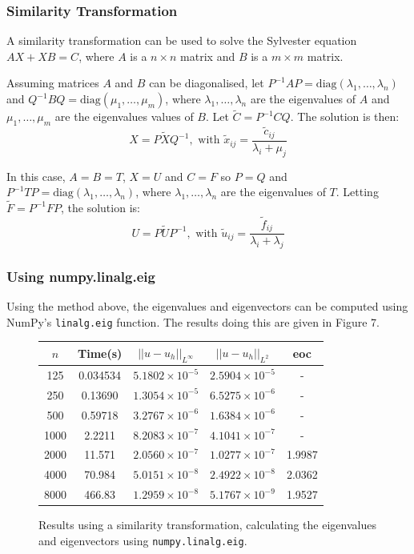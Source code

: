 \documentclass{article}
\numberwithin{equation}{section}
\begin{document}
\subsubsection{Similarity Transformation}
A similarity transformation \cite{Simoncini} can be used to solve the Sylvester equation $AX + XB = C$, where $A$ is a $n \times n$ matrix and $B$ is a $m \times m$ matrix. 

Assuming matrices $A$ and $B$ can be diagonalised, let $P^{-1}AP = \text{diag}(\lambda_1, \dots, \lambda_n)$ and $Q^{-1}BQ = \text{diag}(\mu_1, \dots, \mu_m)$, where $\lambda_1, \dots, \lambda_n$ are the eigenvalues of $A$ and $\mu_1, \dots, \mu_m$ are the eigenvalues values of $B$. Let $\tilde{C} = P^{-1}CQ$. The solution is then:
\[ X = P \tilde{X} Q^{-1}, \text{ with } \tilde{x}_{ij} = \frac{\tilde{c}_{ij}}{\lambda_i + \mu_j} \]

In this case, $A=B=T$, $X=U$ and $C=F$ so $P=Q$ and $P^{-1}TP = \text{diag}(\lambda_1, \dots, \lambda_n)$, where $\lambda_1, \dots, \lambda_n$ are the eigenvalues of $T$. Letting $\tilde{F}=P^{-1}FP$, the solution is:
\[ U = P \tilde{U} P^{-1}, \text{ with } \tilde{u}_{ij} = \frac{\tilde{f}_{ij}}{\lambda_i + \lambda_j} \]

\subsubsection*{Using numpy.linalg.eig}
Using the method above, the eigenvalues and eigenvectors can be computed using NumPy's \texttt{linalg.eig} function. The results doing this are given in Figure 7.

\begin{figure}[H]
\centering
\begin{tabular}{|c|c|c|c|c|}
\hline
$n$ & Time(s) & $|| u - u_h ||_{L^{\infty}}$ &$|| u - u_h ||_{L^{2}}$ & eoc \\
\hline
125 & 0.034534 & $5.1802 \times 10^{-5}$ & $2.5904 \times 10^{-5}$ & - \\
250 & 0.13690 & $1.3054 \times 10^{-5}$ & $6.5275 \times 10^{-6}$ & - \\
500 & 0.59718 & $3.2767 \times 10^{-6}$ & $1.6384 \times 10^{-6}$ & - \\
1000 & 2.2211 & $8.2083 \times 10^{-7}$ & $4.1041 \times 10^{-7}$ & - \\
2000 & 11.571 & $2.0560 \times 10^{-7}$ & $1.0277 \times 10^{-7}$ & 1.9987 \\
4000 & 70.984 & $5.0151 \times 10^{-8}$ & $2.4922 \times 10^{-8}$ & 2.0362 \\
8000 & 466.83 & $1.2959 \times 10^{-8}$ & $5.1767 \times 10^{-9}$ & 1.9527 \\
\hline
\end{tabular}
\captionsetup{justification=centering}
\caption{Results using a similarity transformation, calculating the eigenvalues and eigenvectors using \texttt{numpy.linalg.eig}.}
\end{figure}
\end{document}
